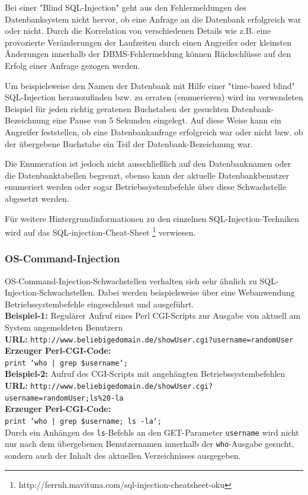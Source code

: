 Bei einer "Blind SQL-Injection" geht aus den Fehlermeldungen des 
Datenbanksystem nicht hervor, ob eine Anfrage an die Datenbank 
erfolgreich war oder nicht. Durch die Korrelation von verschiedenen 
Details wie z.B. eine provozierte Veränderungen der Laufzeiten durch 
einen Angreifer oder kleinsten Änderungen innerhalb der 
DBMS-Fehlermeldung können Rückschlüsse auf den Erfolg einer Anfrage 
gezogen werden.
 
Um beispielsweise den Namen der Datenbank mit Hilfe einer 
"time-based blind" SQL-Injection herauszufinden bzw. zu erraten 
(enumerieren) wird im verwendeten Beispiel für jeden richtig geratenen 
Buchstaben der gesuchten Datenbank-Bezeichnung eine Pause von 5 Sekunden 
eingelegt. Auf diese Weise kann ein Angreifer feststellen, ob eine 
Datenbankanfrage erfolgreich war oder nicht bzw. ob der übergebene 
Buchstabe ein Teil der Datenbank-Bezeichnung war. 

Die Enumeration ist jedoch nicht ausschließlich auf den Datenbanknamen 
oder die Datenbanktabellen begrenzt, ebenso kann der aktuelle 
Datenbankbenutzer enumeriert werden oder sogar Betriebssystembefehle 
über diese Schwachstelle abgesetzt werden.

Für weitere Hintergrundinformationen zu den einzelnen 
SQL-Injection-Techniken wird auf das SQL-injection-Cheat-Sheet
\footnote{http://ferruh.mavituna.com/sql-injection-cheatsheet-oku} 
verwiesen.

\subsubsection{OS-Command-Injection}

OS-Command-Injection-Schwachstellen verhalten sich sehr ähnlich zu 
SQL-Injection-Schwachstellen. Dabei werden beispielsweise über eine 
Webanwendung Betriebssystembefehle eingeschleust und ausgeführt.
\\
\textbf{Beispiel-1:} Regulärer Aufruf eines Perl CGI-Scripts zur Ausgabe von aktuell am System angemeldeten Benutzern
\\
\textbf{URL:} \texttt{http://www.beliebigedomain.de/showUser.cgi?username=randomUser}
\\
\textbf{Erzeuger Perl-CGI-Code:}
\\
\texttt{\footnotesize{print `who | grep \$username`;}}
\\
\textbf{Beispiel-2:} Aufruf des CGI-Scripts mit angehängten Betriebssystembefehlen
\\
\textbf{URL:} \texttt{http://www.beliebigedomain.de/showUser.cgi?\\username=randomUser;ls\%20-la}
\\
\textbf{Erzeuger Perl-CGI-Code:}
\\
\texttt{\footnotesize{print `who | grep \$username; ls -la`;}}
\\
Durch ein Anhängen des \texttt{ls}-Befehls an den GET-Parameter 
\texttt{username} wird nicht nur nach dem übergebenen Benutzernamen 
innerhalb der \texttt{who}-Ausgabe gesucht, sondern auch der Inhalt 
des aktuellen Verzeichnisses ausgegeben.

